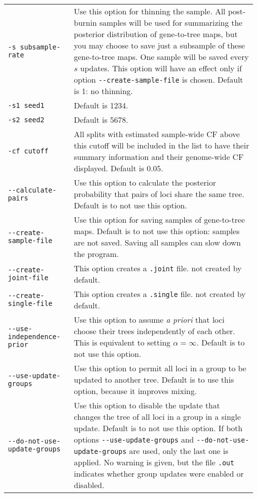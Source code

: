 \documentclass[12pt,english,final,letterpaper]{article}
\begin{document}
\noindent
\hspace*{-.3in}
\begin{tabular}{l|p{4.4in}}
{\tt -s subsample-rate}&Use this option for thinning the sample. All post-burnin samples
will be used for summarizing the posterior distribution of gene-to-tree maps, 
but you may choose to save just a subsample of these gene-to-tree maps. One sample
will be saved every $s$ updates. This option will have an effect only if option
\verb+--create-sample-file+ is chosen. Default is 1: no thinning.\\
{\tt -s1 seed1}&Default is 1234. %
\\
{\tt -s2 seed2}&Default is 5678.\\
{\tt -cf cutoff}&All splits with estimated sample-wide CF above this cutoff 
will be included in the list to have their summary information and their genome-wide CF
displayed. Default is $0.05$.\\
\verb+--calculate-pairs+&Use this option to calculate the 
posterior probability that pairs of loci share the same tree. Default is 
to {\sc not} use this option.\\
\verb+--create-sample-file+&Use this option for saving samples of gene-to-tree maps.
Default is to {\sc not} use this option: samples are not saved. Saving all samples can slow down the program.\\
\verb+--create-joint-file+&This option creates a {\tt .joint} file. 
{\sc not} created by default.\\
\verb+--create-single-file+&This option creates a {\tt .single} file. 
{\sc not} created by default. \\
\verb+--use-independence-prior+&Use this option to assume {\it a priori}
that loci choose their trees independently of each other. This is equivalent
to setting $\alpha=\infty$. Default is to {\sc not} use this option.\\
\verb+--use-update-groups+&Use this option to permit all loci 
in a group to be updated to another tree. Default is to use this option,
because it improves mixing.\\
\verb+--do-not-use-update-groups+&Use this option to disable the update that 
changes the tree of all loci in a group in a single update. Default is to 
{\sc not} use this option. If both options \verb+--use-update-groups+ and 
\verb+--do-not-use-update-groups+ are used, only the last one is applied. 
No warning is given, but the file {\tt .out} indicates
whether group updates were enabled or disabled.\\
\end{tabular}
\end{document}
